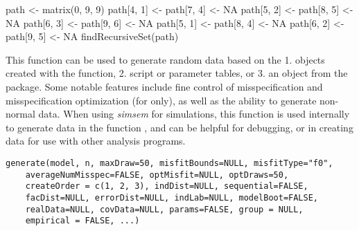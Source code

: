 \documentclass[a4paper]{book}
\begin{document}
%
\begin{Examples}
\begin{ExampleCode}
path <- matrix(0, 9, 9)
path[4, 1] <- path[7, 4] <- NA
path[5, 2] <- path[8, 5] <- NA
path[6, 3] <- path[9, 6] <- NA
path[5, 1] <- path[8, 4] <- NA
path[6, 2] <- path[9, 5] <- NA
findRecursiveSet(path)
\end{ExampleCode}
\end{Examples}
%
\begin{Description}\relax
This function can be used to generate random data based on the 1.  objects created with the  function, 2.  script or parameter tables, or 3. an  object from the  package. Some notable features include fine control of misspecification and misspecification optimization (for  only), as well as the ability to generate non-normal data. When using \emph{simsem} for simulations, this function is used internally to generate data in the function , and can be helpful for debugging, or in creating data for use with other analysis programs. 
\end{Description}
%
\begin{Usage}
\begin{verbatim}
generate(model, n, maxDraw=50, misfitBounds=NULL, misfitType="f0",
	averageNumMisspec=FALSE, optMisfit=NULL, optDraws=50, 
	createOrder = c(1, 2, 3), indDist=NULL, sequential=FALSE,	
	facDist=NULL, errorDist=NULL, indLab=NULL, modelBoot=FALSE, 
	realData=NULL, covData=NULL, params=FALSE, group = NULL, 
	empirical = FALSE, ...)
\end{verbatim}
\end{Usage}
%
\end{document}
